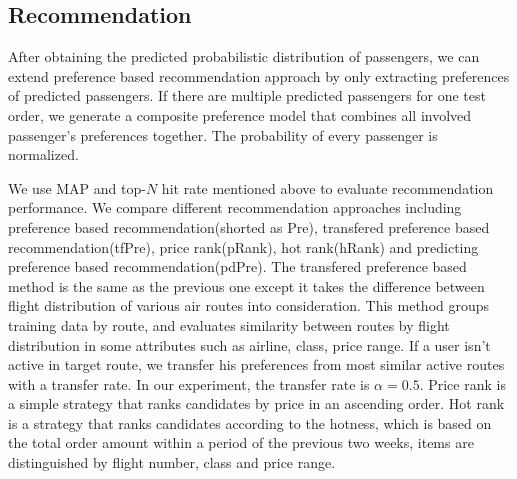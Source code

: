 \documentclass{llncs}
\begin{document}
\subsection{Recommendation}
After obtaining the predicted probabilistic distribution of passengers, we can extend preference based recommendation approach by only extracting preferences of predicted passengers. If there are multiple predicted passengers for one test order, we generate a composite preference model that combines all involved passenger's preferences together. The probability of every passenger is normalized.\par
We use MAP and top-$N$ hit rate mentioned above to evaluate recommendation performance. We compare different recommendation approaches including preference based recommendation(shorted as Pre), transfered preference based recommendation(tfPre), price rank(pRank), hot rank(hRank) and predicting preference based recommendation(pdPre). The transfered preference based method is the same as the previous one except it takes the difference between flight distribution of various air routes into consideration. This method groups training data by route, and evaluates similarity between routes by flight distribution in some attributes such as airline, class, price range. If a user isn't active in target route, we transfer his preferences from most similar active routes with a transfer rate. In our experiment, the transfer rate is  $ \alpha = 0.5$. Price rank is a simple strategy that ranks candidates by price in an ascending order. Hot rank is a strategy that ranks candidates according to the hotness, which is based on the total order amount within a period of the previous two weeks, items are distinguished by flight number, class and price range.\par
\end{document}
